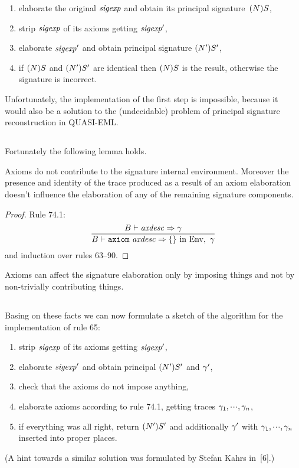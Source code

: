 \begin{enumerate}
\item elaborate the original ${\it sigexp}$ and obtain its principal signature~$(N)S$,
\item strip ${\it sigexp}$ of its axioms getting ${\it sigexp}'$,
\item elaborate ${\it sigexp}'$ and obtain principal signature $(N')S'$,
\item if $(N)S$ and $(N')S'$ are identical
      then $(N)S$ is the result, otherwise the signature is incorrect.
\end{enumerate}
Unfortunately, the implementation of the first step is impossible,
because it would also be a solution to the (undecidable) problem of
principal signature reconstruction in QUASI-EML.

\subsection{\seccomforting}
\label{sec:comforting}

Fortunately the following lemma holds.

\begin{lem}[\thmcomforting]
\label{thm:comforting}
Axioms do not contribute to the signature internal environment.
Moreover the presence and identity of the trace produced as a result of an axiom elaboration    
doesn't influence the elaboration of any of the remaining signature components.
\end{lem}

\begin{proof}
Rule 74.1:
$$
\frac{B\vdash{\it axdesc}\Rightarrow\gamma}
     {B\vdash{\tt axiom}\ {\it axdesc}\Rightarrow\{\}\ \mbox{\rm in}\ {\rm Env},\ \gamma}
$$
and induction over rules 63--90.
\end{proof}

\begin{cor}
Axioms can affect the signature elaboration only by
imposing things and not by non-trivially contributing things.
\end{cor}

\subsection{\secmature}
\label{sec:mature}

Basing on these facts we can now formulate a sketch
of the algorithm for the implementation of rule 65:
\begin{enumerate}
\item strip ${\it sigexp}$ of its axioms getting ${\it sigexp}'$,
\item elaborate ${\it sigexp}'$ and obtain principal $(N')S'$ and $\gamma'$,
\item check that the axioms do not impose anything,
\item elaborate axioms according to rule 74.1, getting traces $\gamma_1,\mbox{$\cdot\!\cdot\!\cdot$},\gamma_n$,
\label{step:elaborate}
\item if everything was all right, return $(N')S'$ and additionally $\gamma'$ 
      with $\gamma_1,\mbox{$\cdot\!\cdot\!\cdot$},\gamma_n$ inserted into proper places.
\end{enumerate}
(A hint towards a similar solution was formulated by Stefan Kahrs in~[6].)

